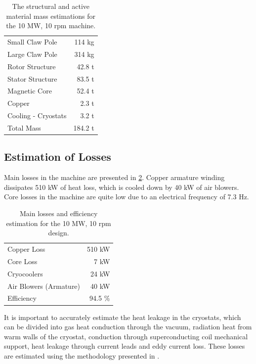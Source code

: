 \documentclass[12pt]{iopart}
\begin{document}
\begin{table}
  \centering
  \begin{tabular}{lr}
\hline
Small Claw Pole & 114 kg \\
Large Claw Pole & 314 kg \\
\hline
Rotor Structure & 42.8 t \\
Stator Structure & 83.5 t \\
\hline
Magnetic Core & 52.4 t\\
Copper & 2.3 t\\
Cooling - Cryostats & 3.2 t \\
\hline
Total Mass & 184.2 t \\
\hline
 \end{tabular}
  \caption{The structural and active material mass estimations for the 10 MW, 10 rpm machine.}
  \label{10MW_total_mass}
\end{table}


\subsection{Estimation of Losses}

Main losses in the machine are presented in \ref{10MW_efficiency}. Copper armature winding dissipates 510 kW of heat loss, which is cooled down by 40 kW of air blowers. Core losses in the machine are quite low due to an electrical frequency of 7.3 Hz.

\begin{table}[]
  \centering
  \begin{tabular}{lr}
\hline
Copper Loss & 510 kW \\
Core Loss & 7 kW \\
Cryocoolers & 24 kW \\
Air Blowers (Armature) & 40 kW \\
\hline
Efficiency & 94.5 \% \\
\hline
\end{tabular}
  \caption{Main losses and efficiency estimation for the 10 MW, 10 rpm design.}
  \label{10MW_efficiency}
\end{table}

It is important to accurately estimate the heat leakage in the cryostats, which can be divided into gas heat conduction through the vacuum, radiation heat from  warm walls of the cryostat, conduction through superconducting coil mechanical support, heat leakage through current leads and eddy current loss. These losses are estimated using the methodology presented in \cite{Abrahamsen2012, Simons2013}. 
\end{document}
